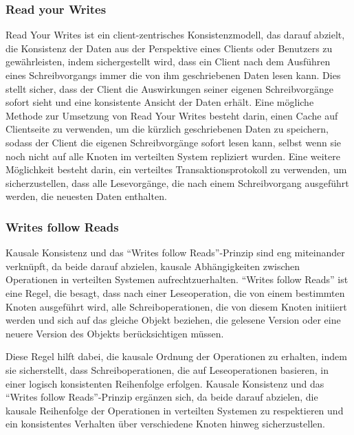 \documentclass[../vs-script-first-v01.tex]{subfiles}
\begin{document}
\subsubsection{Read your Writes}
Read Your Writes ist ein client-zentrisches Konsistenzmodell, das darauf abzielt, die Konsistenz der Daten aus der Perspektive eines Clients oder Benutzers zu gewährleisten, indem sichergestellt wird, dass ein Client nach dem Ausführen eines Schreibvorgangs immer die von ihm geschriebenen Daten lesen kann. Dies stellt sicher, dass der Client die Auswirkungen seiner eigenen Schreibvorgänge sofort sieht und eine konsistente Ansicht der Daten erhält.
Eine mögliche Methode zur Umsetzung von Read Your Writes besteht darin, einen Cache auf Clientseite zu verwenden, um die kürzlich geschriebenen Daten zu speichern, sodass der Client die eigenen Schreibvorgänge sofort lesen kann, selbst wenn sie noch nicht auf alle Knoten im verteilten System repliziert wurden. Eine weitere Möglichkeit besteht darin, ein verteiltes Transaktionsprotokoll zu verwenden, um sicherzustellen, dass alle Lesevorgänge, die nach einem Schreibvorgang ausgeführt werden, die neuesten Daten enthalten.

\subsubsection{Writes follow Reads}
Kausale Konsistenz und das \enquote{Writes follow Reads}-Prinzip sind eng miteinander verknüpft, da beide darauf abzielen, kausale Abhängigkeiten zwischen Operationen in verteilten Systemen aufrechtzuerhalten. \enquote{Writes follow Reads} ist eine Regel, die besagt, dass nach einer Leseoperation, die von einem bestimmten Knoten ausgeführt wird, alle Schreiboperationen, die von diesem Knoten initiiert werden und sich auf das gleiche Objekt beziehen, die gelesene Version oder eine neuere Version des Objekts berücksichtigen müssen.

Diese Regel hilft dabei, die kausale Ordnung der Operationen zu erhalten, indem sie sicherstellt, dass Schreiboperationen, die auf Leseoperationen basieren, in einer logisch konsistenten Reihenfolge erfolgen. Kausale Konsistenz und das \enquote{Writes follow Reads}-Prinzip ergänzen sich, da beide darauf abzielen, die kausale Reihenfolge der Operationen in verteilten Systemen zu respektieren und ein konsistentes Verhalten über verschiedene Knoten hinweg sicherzustellen.
\end{document}
